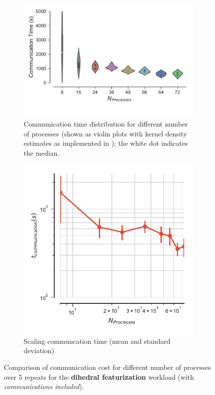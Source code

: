\begin{figure}[ht!]
\begin{subfigure} {.55\textwidth}
  \centering
  \includegraphics[width=\linewidth]{figures/ViolinPlot-Ncores-comparison-comm-dihedral.pdf}
  \caption{Communication time distribution for different number of
    processes (shown as violin plots \protect\cite{Hintze:1998tw}
    with kernel density estimates as implemented in
    ); the white dot indicates the median.}
\end{subfigure}
\hfill
\begin{subfigure}{.35\textwidth}
  \centering
  \includegraphics[width=\linewidth]{figures/t_comm_mean-dihedral.pdf}
  \caption{Scaling communcation time (mean and standard deviation)}
\end{subfigure}
\caption{Comparison of communication cost for different number of
  processes over 5 repeats for the \textbf{dihedral featurization}
  workload (with \emph{communications included}).}
\label{fig:comparison-t_comm-dihedral}
\end{figure}

